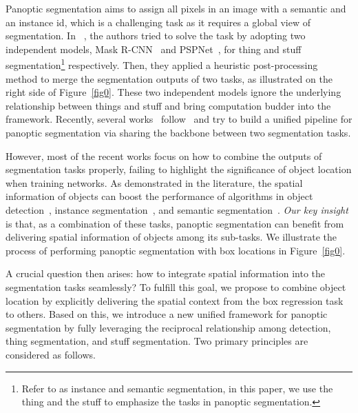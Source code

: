 \documentclass[journal,final]{IEEEtran}
\begin{document}
Panoptic segmentation aims to assign all pixels in an image with a semantic and an instance id, which is a challenging task as it requires a global view of segmentation. In ~\cite{panopticsegmentation}, the authors tried to solve the task by adopting two independent models, Mask R-CNN~\cite{maskrcnn} and PSPNet~\cite{pspnet}, for thing and stuff segmentation\footnote{Refer to as instance and semantic segmentation, in this paper, we use the thing and the stuff to emphasize the tasks in panoptic segmentation.} respectively. Then, they applied a heuristic post-processing method to merge the segmentation outputs of two tasks, as illustrated on the right side of Figure~\ref{fig0}. These two independent models ignore the underlying relationship between things and stuff and bring computation budder into the framework. Recently, several works~\cite{jsisnet,tascnet,panopticfpn,aunet,upsnet,panopticranking} follow~\cite{panopticsegmentation} and try to build a unified pipeline for panoptic segmentation via sharing the backbone between two segmentation tasks. 

However, most of the recent works focus on how to combine the outputs of segmentation tasks properly, failing to highlight the significance of object location when training networks. As demonstrated in the literature, the spatial information of objects can boost the performance of algorithms in object detection~\cite{enrichedssd,garpn}, instance segmentation~\cite{htc,yolact}, and semantic segmentation~\cite{boxsup,boxdriven}. {\em Our key insight} is that, as a combination of these tasks, panoptic segmentation can benefit from delivering spatial information of objects among its sub-tasks. We illustrate the process of performing panoptic segmentation with box locations in Figure~\ref{fig0}. 

A crucial question then arises: how to integrate spatial information into the segmentation tasks seamlessly? To fulfill this goal, we propose to combine object location by explicitly delivering the spatial context from the box regression task to others. Based on this, we introduce a new unified framework for panoptic segmentation by fully leveraging the reciprocal relationship among detection, thing segmentation, and stuff segmentation. Two primary principles are considered as follows.
\end{document}
